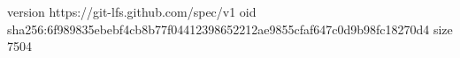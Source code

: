 version https://git-lfs.github.com/spec/v1
oid sha256:6f989835ebebf4cb8b77f04412398652212ae9855cfaf647c0d9b98fc18270d4
size 7504

